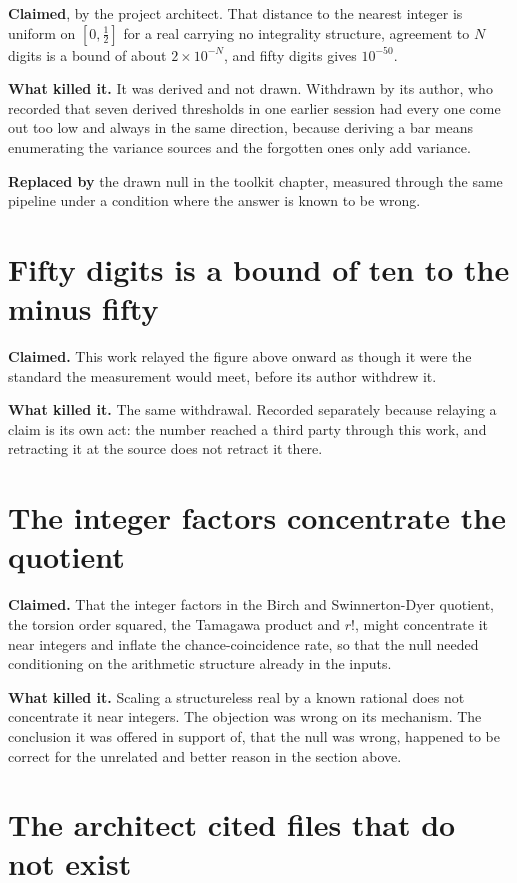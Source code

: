 \textbf{Claimed}, by the project architect. That distance to the nearest integer is uniform on
$[0,\tfrac12]$ for a real carrying no integrality structure, agreement to $N$ digits is a bound
of about $2\times10^{-N}$, and fifty digits gives $10^{-50}$.

\textbf{What killed it.} It was derived and not drawn. Withdrawn by its author, who recorded
that seven derived thresholds in one earlier session had every one come out too low and always in
the same direction, because deriving a bar means enumerating the variance sources and the forgotten
ones only add variance.

\textbf{Replaced by} the drawn null in the toolkit chapter, measured through the same pipeline under
a condition where the answer is known to be wrong.

\section{Fifty digits is a bound of ten to the minus fifty}

\textbf{Claimed.} This work relayed the figure above onward as though it were the standard the
measurement would meet, before its author withdrew it.

\textbf{What killed it.} The same withdrawal. Recorded separately because relaying a claim is its
own act: the number reached a third party through this work, and retracting it at the source does
not retract it there.

\section{The integer factors concentrate the quotient}

\textbf{Claimed.} That the integer factors in the Birch and Swinnerton-Dyer quotient, the torsion
order squared, the Tamagawa product and $r!$, might concentrate it near integers and inflate the
chance-coincidence rate, so that the null needed conditioning on the arithmetic structure already
in the inputs.

\textbf{What killed it.} Scaling a structureless real by a known rational does not concentrate it
near integers. The objection was wrong on its mechanism. The conclusion it was offered in support
of, that the null was wrong, happened to be correct for the unrelated and better reason in the
section above.

\section{The architect cited files that do not exist}

